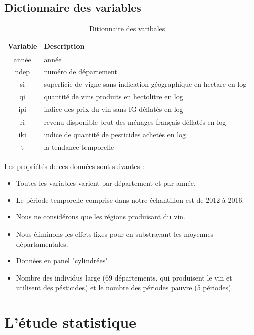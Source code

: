 \documentclass[11pt,]{article}
\begin{document}
\hypertarget{dictionnaire-des-variables}{%
\subsection{Dictionnaire des
variables}\label{dictionnaire-des-variables}}

\FloatBarrier

\begin{table}[!htbp]
  \centering
\caption{Ditionnaire des varibales}
\begin{tabular}{c|l}
  \hline
  Variable & Description \\
  \hline
année & année \\
ndep & numéro de département \\
si & superficie de vigne sans indication géographique en hectare en log \\
qi & quantité de vins produits en hectolitre en log \\
ipi & indice des prix du vin sans IG déflatés en log  \\
ri & revenu disponible brut des ménages français déflatés en log \\
iki & indice de quantité de pesticides achetés en log \\
t & la tendance temporelle \\
\hline
\end{tabular}
\end{table}

\FloatBarrier

Les propriétés de ces données sont suivantes :

\begin{itemize}
  \item Toutes les variables varient par département et par année.
  \item Le période temporelle comprise dans notre échantillon est de 2012 à 2016.
  \item Nous ne considérons que les régions produisant du vin. 
  \item Nous éliminons les effets fixes pour en substrayant les moyennes départamentales.
  \item Données en panel "cylindrées".
  \item Nombre des individus large (69 départements, qui produisent le vin et utilisent des pésticides) et le nombre des périodes pauvre (5 périodes).
\end{itemize}

\hypertarget{letude-statistique}{%
\section{L'étude statistique}\label{letude-statistique}}
\end{document}
